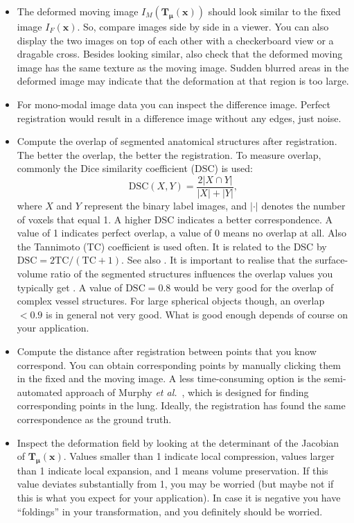 \documentclass[]{report}
\newcommand{\etal}{\emph{et al.}}
\newcommand{\vx}{\bm{x}}
\newcommand{\vmu}{\bm{\mu}}
\newcommand{\vT}{\bm{T}}
\newcommand{\vTmx}{\bm{T}_{\vmu}(\bm{x})}
\begin{document}
\begin{itemize}
\item The deformed moving image $I_M(\vT_{\vmu}(\vx))$ should
look similar to the fixed image $I_F(\vx)$. So, compare images side
by side in a viewer. You can also display the two images on top of
each other with a checkerboard view or a dragable cross. Besides
looking similar, also check that the deformed moving image has the
same texture as the moving image. Sudden blurred areas in the
deformed image may indicate that the deformation at that region is
too large.

\item For mono-modal image data you can inspect the difference
image. Perfect registration would result in a difference image
without any edges, just noise.

\item Compute the overlap of segmented anatomical structures
after registration. The better the overlap, the better the
registration. To measure overlap, commonly the Dice similarity
coefficient (DSC) is used:
\begin{equation}
  \mathrm{DSC}(X,Y) = \frac{2 |X \cap Y|}{|X|+|Y|},
\end{equation}
where $X$ and $Y$ represent the binary label images, and $|\cdot|$
denotes the number of voxels that equal 1. A higher DSC indicates a
better correspondence. A value of 1 indicates perfect overlap, a
value of 0 means no overlap at all. Also the Tannimoto (TC)
coefficient is used often. It is related to the DSC by
$\mathrm{DSC}=2\mathrm{TC}/(\mathrm{TC}+1)$. See also
\cite{Cru06:Generalized}. It is important to realise that the
surface-volume ratio of the segmented structures influences the
overlap values you typically get \citep{Roh04:Evaluation}. A value
of $\mathrm{DSC}=0.8$ would be very good for the overlap of complex
vessel structures. For large spherical objects though, an overlap
$<0.9$ is in general not very good. What is good enough depends of
course on your application.

\item Compute the distance after registration between points that you know correspond.
You can obtain corresponding points by manually clicking them in the
fixed and the moving image. A less time-consuming option is the
semi-automated approach of Murphy \etal\ \cite{Murphy08}, which is
designed for finding corresponding points in the lung. Ideally, the
registration has found the same correspondence as the ground truth.

\item Inspect the deformation field by looking at the determinant of
the Jacobian of $\vTmx$. Values smaller than 1 indicate local
compression, values larger than 1 indicate local expansion, and 1
means volume preservation. If this value deviates substantially
from 1, you may be worried (but maybe not if this is what you
expect for your application). In case it is negative you have
``foldings'' in your transformation, and you definitely should be
worried.


\end{itemize}
\end{document}
